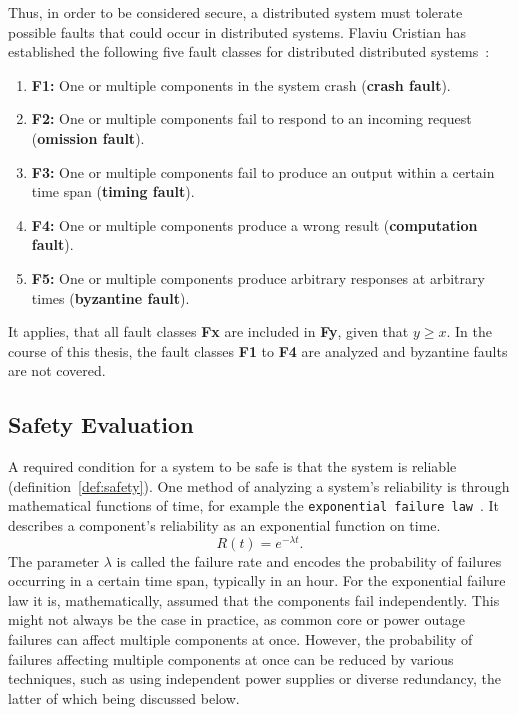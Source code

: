 Thus, in order to be considered secure, a distributed system must tolerate possible faults that could occur in distributed systems.
Flaviu Cristian has established the following five fault classes for distributed distributed systems~\cite{CristianFaultModel}:

\begin{enumerate}
\item \textbf{F1:} One or multiple components in the system crash (\textbf{crash fault}).
\item \textbf{F2:} One or multiple components fail to respond to an incoming request (\textbf{omission fault}).
\item \textbf{F3:} One or multiple components fail to produce an output within a certain time span (\textbf{timing fault}).
\item \textbf{F4:} One or multiple components produce a wrong result (\textbf{computation fault}).
\item \textbf{F5:} One or multiple components produce arbitrary responses at arbitrary times (\textbf{byzantine fault}).
\end{enumerate}

It applies, that all fault classes \textbf{Fx} are included in \textbf{Fy}, given that $y \geq x$.
In the course of this thesis, the fault classes \textbf{F1} to \textbf{F4} are analyzed and byzantine faults are not covered.

\subsection{Safety Evaluation}
\label{sec:safetyEvaluation}
A required condition for a system to be safe is that the system is reliable (definition~\autoref{def:safety}).
One method of analyzing a system's reliability is through mathematical functions of time, for example the \texttt{exponential failure law}~\cite{GeffroyMotetDependableComputing}.
It describes a component's reliability as an exponential function on time.
\begin{equation}
R(t) = e^{-\lambda t}.
\label{eq:expFailureLaw}
\end{equation}
The parameter $\lambda$ is called the failure rate and encodes the probability of failures occurring in a certain time span, typically in an hour.
For the exponential failure law it is, mathematically, assumed that the components fail independently.
This might not always be the case in practice, as common core or power outage failures can affect multiple components at once.
However, the probability of failures affecting multiple components at once can be reduced by various techniques, such as using independent power supplies or diverse redundancy, the latter of which being discussed below.
\\

